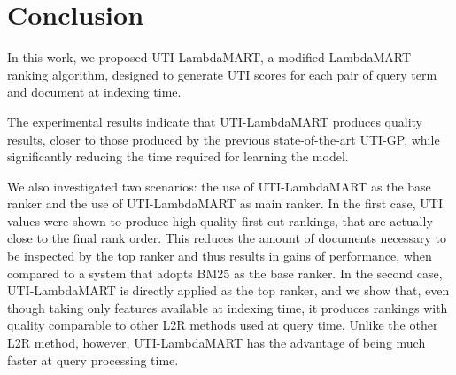 \documentclass[preprint,review,10pt,3p]{elsarticle}
\begin{document}






\section{Conclusion}

In this work, we proposed UTI-LambdaMART, a modified LambdaMART ranking algorithm, designed to generate UTI scores for each pair of query term and document at indexing time.

The experimental results indicate that UTI-LambdaMART produces quality results, closer to those produced by the previous state-of-the-art UTI-GP, while significantly reducing the time required for learning the model. 

We also investigated two scenarios: the use of UTI-LambdaMART as the base ranker and the use of UTI-LambdaMART as main ranker. In the first case, UTI values were shown to produce high quality first cut rankings, that are actually close to the final rank order. This reduces the amount of documents necessary to be inspected by the top ranker and thus results
in gains of performance, when compared to a system that adopts BM25 as the base ranker. In the second case, UTI-LambdaMART is directly applied as the top ranker, and we show that, even though taking only features available at indexing time, it produces rankings with quality comparable to other L2R methods used at query time. Unlike the other L2R method, however, UTI-LambdaMART has the advantage of being much faster at query processing time.


\end{document}
